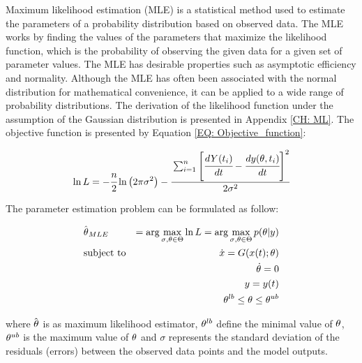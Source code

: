 \documentclass[../Article_Model_Parameters.tex]{subfiles}
\begin{document}
	Maximum likelihood estimation (MLE) is a statistical method used to estimate the parameters of a probability distribution based on observed data. The MLE works by finding the values of the parameters that maximize the likelihood function, which is the probability of observing the given data for a given set of parameter values. The MLE has desirable properties such as asymptotic efficiency and normality. Although the MLE has often been associated with the normal distribution for mathematical convenience, it can be applied to a wide range of probability distributions. The derivation of the likelihood function under the assumption of the Gaussian distribution is presented in Appendix \ref{CH: ML}. The objective function is presented by Equation \ref{EQ: Objective_function}:
	
	{\footnotesize
		\begin{equation} \label{EQ: Objective_function}
			\ln L = -\cfrac{n}{2}  \ln \left(2 \pi \sigma^2\right) 
			- \cfrac{ \sum_{i=1}^{n} \left[  \cfrac{d {Y}(t_i)}{dt} - \cfrac{d{\color{black}y}({\color{black} \theta}, t_i)}{dt} \right]^2 }{2 {\color{black} \sigma}^2}
		\end{equation}
	}
	
	The parameter estimation problem can be formulated as follow:
	
	{\footnotesize
		\begin{equation}
			\begin{aligned} \label{EQ: Optimization_formulation_MLE}
				&\hat{{\color{black} \theta}}_{MLE} &= \arg \max_{{\color{black} \sigma}, {\color{black} \theta} \in \Theta} \ln L = \arg \max_{{\color{black} \sigma},{\color{black} \theta} \in \Theta} p({\color{black} \theta}|{\color{black}y}) \\
				&\text{subject to}
				& \dot{ {\color{black}x} } = {\color{black}G}({\color{black} x}(t);{\color{black} \theta}) \\
				&& {\color{black} \dot{\theta}} = 0 \\
				&& {\color{black}y} = {\color{black}y}(t) \\
				&& {\color{black} \theta}^{lb} \leq {\color{black} \theta} \leq {\color{black} \theta}^{ub}
			\end{aligned}
	\end{equation} } 
	
	where $\hat{{\color{black} \theta}}$ is as maximum likelihood estimator, ${\color{black} \theta}^{lb}$ define the minimal value of ${\color{black} \theta}$, ${\color{black} \theta}^{ub}$ is the maximum value of ${\color{black} \theta}$ and $\sigma$ represents the standard deviation of the residuals (errors) between the observed data points and the model outputs.
	
\end{document}
